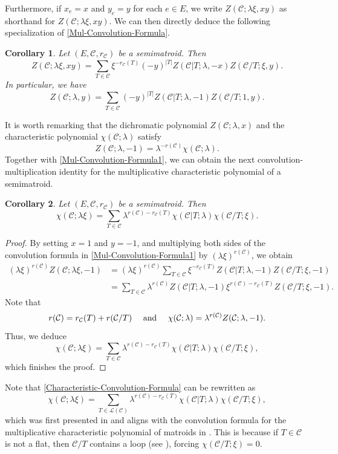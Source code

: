 \documentclass[12pt]{article}%
\renewcommand*{\bm}[1]{#1}%
\numberwithin{equation}{section}
\def\And{\mbox{\rm ~and~}}
\newtheorem{corollary}[corollary]{Corollary}
\begin{document}
Furthermore, if $x_e=x$ and $y_e=y$ for each $e\in E$, we write $Z(\mathcal{C};\lambda\xi,xy)$ as shorthand for $Z(\mathcal{C};\lambda\xi,\bm x\bm y)$. We can then directly deduce the following specialization of \autoref{Mul-Convolution-Formula}.
\begin{corollary}\label{Mul-Convolution-Formula1}
Let $(E,\mathcal{C},r_{\mathcal{C}})$ be a semimatroid. Then
\[
Z(\mathcal{C};\lambda\xi,xy)=\sum_{T\in\mathcal{C}}\xi^{-r_\mathcal{C}(T)}(-y)^{|T|}Z(\mathcal{C}|T;\lambda,-x)Z(\mathcal{C}/T;\xi,y).
\]
In particular, we have
\[
Z(\mathcal{C};\lambda,y)=\sum_{T\in\mathcal{C}}(-y)^{|T|}Z(\mathcal{C}|T;\lambda,-1)Z(\mathcal{C}/T;1,y).
\]
\end{corollary}
It is worth remarking that the dichromatic polynomial $Z(\mathcal{C};\lambda,x)$ and the characteristic polynomial $\chi(\mathcal{C};\lambda)$ satisfy
\begin{equation}\label{Relation0}
Z(\mathcal{C};\lambda,-1)=\lambda^{-r(\mathcal{C})}\chi(\mathcal{C};\lambda).
\end{equation}
Together with \autoref{Mul-Convolution-Formula1}, we can obtain the next convolution-multiplication identity for the multiplicative characteristic polynomial of a semimatroid.
\begin{corollary}\label{Characteristic-Convolution-Formula}
Let $(E,\mathcal{C},r_{\mathcal{C}})$ be a semimatroid. Then
\[
\chi(\mathcal{C};\lambda\xi)=\sum_{T\in\mathcal{C}}\lambda^{r(\mathcal{C})-r_\mathcal{C}(T)}\chi(\mathcal{C}|T;\lambda)
\chi(\mathcal{C}/T;\xi).
\]
\end{corollary}
\begin{proof}
By setting $x=1$ and $y=-1$, and multiplying both sides of the convolution formula in \autoref{Mul-Convolution-Formula1} by $(\lambda\xi)^{r(\mathcal{C})}$, we obtain
\begin{align*}
(\lambda\xi)^{r(\mathcal{C})}Z(\mathcal{C};\lambda\xi,-1)&=(\lambda\xi)^{r(\mathcal{C})}\sum_{T\in\mathcal{C}}
\xi^{-r_\mathcal{C}(T)}Z(\mathcal{C}|T;\lambda,-1)Z(\mathcal{C}/T;\xi,-1)\\
&=\sum_{T\in\mathcal{C}}\lambda^{r(\mathcal{C})}Z(\mathcal{C}|T;\lambda,-1)\xi^{r(\mathcal{C})-r_\mathcal{C}(T)}Z(\mathcal{C}/T;\xi,-1).
\end{align*}
Note that 
\[
r(\mathcal{C})=r_\mathcal{C}(T)+r(\mathcal{C}/T)\quad\And\quad \chi(\mathcal{C};\lambda)=\lambda^{r(\mathcal{C})}Z(\mathcal{C};\lambda,-1).
\]
Thus, we deduce
\[
\chi(\mathcal{C};\lambda\xi)=\sum_{T\in\mathcal{C}}\lambda^{r(\mathcal{C})-r_\mathcal{C}(T)}\chi(\mathcal{C}|T;\lambda)
\chi(\mathcal{C}/T;\xi),
\]
which finishes the proof.
\end{proof}
Note that \autoref{Characteristic-Convolution-Formula} can be rewritten as
\[
\chi(\mathcal{C};\lambda\xi)=\sum_{T\in\mathscr{L}(\mathcal{C})}\lambda^{r(\mathcal{C})-r_\mathcal{C}(T)}\chi(\mathcal{C}|T;\lambda)
\chi(\mathcal{C}/T;\xi),
\]
which was first presented in \cite[Theorem 3.4]{Fu2025} and aligns with the convolution formula for the multiplicative
characteristic polynomial of matroids in \cite[Theorem 4]{Kung2004}. This is because if  $T\in\mathcal{C}$ is not a flat, then $\mathcal{C}/T$ contains a loop (see \cite[Lemma 3.6]{Fu2025}), forcing $\chi(\mathcal{C}/T;\xi)=0$.
\end{document}
